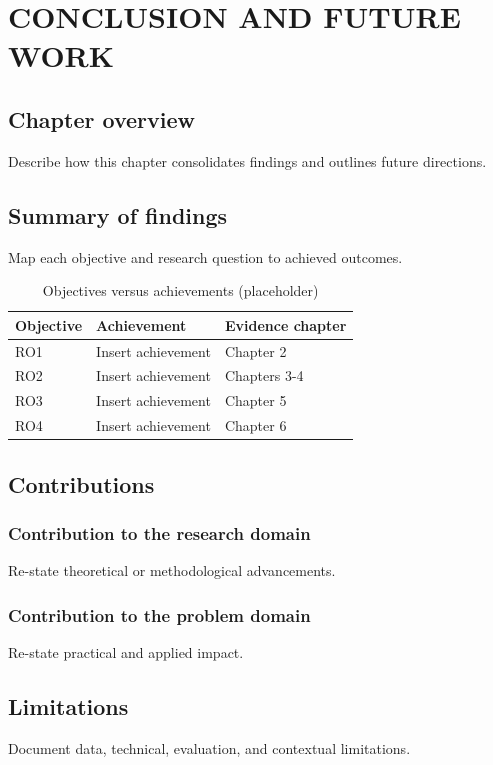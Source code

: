\chapter{CONCLUSION AND FUTURE WORK}
\section{Chapter overview}
Describe how this chapter consolidates findings and outlines future directions.

\section{Summary of findings}
Map each objective and research question to achieved outcomes.

\begin{table}[H]
    \centering
    \begin{tabular}{|l|l|l|}
        \hline
        Objective & Achievement & Evidence chapter \\
        \hline
        RO1 & Insert achievement & Chapter 2 \\
        RO2 & Insert achievement & Chapters 3-4 \\
        RO3 & Insert achievement & Chapter 5 \\
        RO4 & Insert achievement & Chapter 6 \\
        \hline
    \end{tabular}
    \caption{Objectives versus achievements (placeholder)}
    \label{tab:objectives-achievements}
\end{table}

\section{Contributions}
\subsection{Contribution to the research domain}
Re-state theoretical or methodological advancements.

\subsection{Contribution to the problem domain}
Re-state practical and applied impact.

\section{Limitations}
Document data, technical, evaluation, and contextual limitations.

